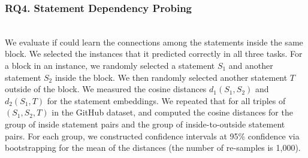 \subsubsection{RQ4. Statement Dependency Probing}~\\
We evaluate if {\tool} could learn the connections
among the statements inside the same  block. We
selected the instances that it predicted correctly in all three
tasks. For a  block in an instance, we randomly
selected a statement $S_1$ and another statement $S_2$ inside the
block. We then randomly selected another statement $T$ outside of the
block. We measured the cosine distances $d_1(S_1,S_2)$ and $d_2(S_1,T)$
for the statement embeddings. We repeated that for all triples
of $(S_1,S_2,T)$ in the GitHub dataset, and computed the cosine
distances for the group of inside statement pairs and the group of
inside-to-outside statement pairs. For each group, we constructed
confidence intervals at 95\% confidence via bootstrapping for the mean
of the distances (the number of re-samples is 1,000).
